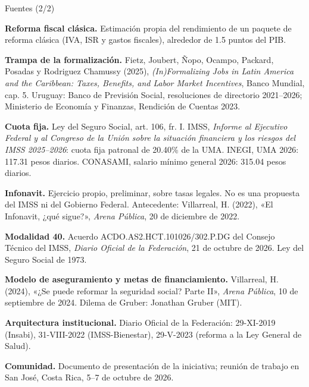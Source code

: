 \documentclass[aspectratio=169,10pt]{beamer}
\begin{document}
\begin{frame}{Fuentes (2/2)}
  \vspace{0.2em}
  {\fontsize{6.6}{8.4}\selectfont\raggedright
  \textbf{Reforma fiscal clásica.} Estimación propia del rendimiento de un paquete de reforma clásica (IVA, ISR y gastos fiscales), alrededor de 1.5 puntos del PIB.\par\vspace{0.6em}
  \textbf{Trampa de la formalización.} Fietz, Joubert, Ñopo, Ocampo, Packard, Posadas y Rodriguez Chamussy (2025), \emph{(In)Formalizing Jobs in Latin America and the Caribbean: Taxes, Benefits, and Labor Market Incentives}, Banco Mundial, cap. 5. Uruguay: Banco de Previsión Social, resoluciones de directorio 2021--2026; Ministerio de Economía y Finanzas, Rendición de Cuentas 2023.\par\vspace{0.6em}
  \textbf{Cuota fija.} Ley del Seguro Social, art. 106, fr. I. IMSS, \emph{Informe al Ejecutivo Federal y al Congreso de la Unión sobre la situación financiera y los riesgos del IMSS 2025--2026}: cuota fija patronal de 20.40\% de la UMA. INEGI, UMA 2026: 117.31 pesos diarios. CONASAMI, salario mínimo general 2026: 315.04 pesos diarios.\par\vspace{0.6em}
  \textbf{Infonavit.} Ejercicio propio, preliminar, sobre tasas legales. No es una propuesta del IMSS ni del Gobierno Federal. Antecedente: Villarreal, H. (2022), «El Infonavit, ¿qué sigue?», \emph{Arena Pública}, 20 de diciembre de 2022.\par\vspace{0.6em}
  \textbf{Modalidad 40.} Acuerdo ACDO.AS2.HCT.101026/302.P.DG del Consejo Técnico del IMSS, \emph{Diario Oficial de la Federación}, 21 de octubre de 2026. Ley del Seguro Social de 1973.\par\vspace{0.6em}
  \textbf{Modelo de aseguramiento y metas de financiamiento.} Villarreal, H. (2024), «¿Se puede reformar la seguridad social? Parte II», \emph{Arena Pública}, 10 de septiembre de 2024. Dilema de Gruber: Jonathan Gruber (MIT).\par\vspace{0.6em}
  \textbf{Arquitectura institucional.} Diario Oficial de la Federación: 29-XI-2019 (Insabi), 31-VIII-2022 (IMSS-Bienestar), 29-V-2023 (reforma a la Ley General de Salud).\par\vspace{0.6em}
  \textbf{Comunidad.} Documento de presentación de la iniciativa; reunión de trabajo en San José, Costa Rica, 5--7 de octubre de 2026.\par}
\end{frame}
\end{document}
